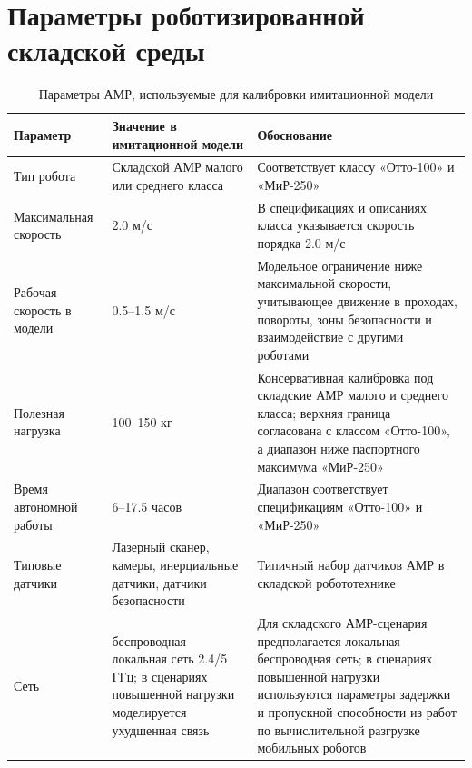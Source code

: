\chapter{Параметры роботизированной складской среды}\label{app:A}

\begin{table}[h]
	\centering
	\small
	\caption{Параметры АМР, используемые для калибровки имитационной модели}
	\label{tab:amr_real_params}
	\begin{tabular}{|p{}|p{}|p{}|}
		\hline
		\textbf{Параметр} &
		\textbf{Значение в имитационной модели} &
		\textbf{Обоснование} \\
		\hline
		Тип робота &
		Складской АМР малого или среднего класса &
		Соответствует классу «Отто-100» и «МиР-250»
		\cite{OTTO100Spec2026,MiR250Spec2026} \\
		\hline
		Максимальная скорость &
		2.0 м/с &
		В спецификациях и описаниях класса указывается
		скорость порядка 2.0 м/с \\
		\hline
		Рабочая скорость в модели &
		0.5--1.5 м/с &
		Модельное ограничение ниже максимальной скорости, учитывающее движение в
		проходах, повороты, зоны безопасности и взаимодействие с другими роботами \\
		\hline
		Полезная нагрузка &
		100--150 кг &
		Консервативная калибровка под складские АМР малого и среднего класса; верхняя граница согласована с классом «Отто-100», а диапазон ниже паспортного максимума «МиР-250» \\
		\hline
		Время автономной работы &
		6--17.5 часов &
		Диапазон соответствует спецификациям «Отто-100» и «МиР-250» \\
		\hline
		Типовые датчики &
		Лазерный сканер, камеры, инерциальные датчики, датчики безопасности &
		Типичный набор датчиков АМР в складской робототехнике
		\cite{Keith2024WarehouseAMRReview} \\
		\hline
		Сеть &
		беспроводная локальная сеть 2.4/5 ГГц; в сценариях повышенной нагрузки моделируется ухудшенная связь &
		Для складского АМР-сценария предполагается локальная беспроводная сеть; в
		сценариях повышенной нагрузки используются параметры задержки и пропускной способности из
		работ по вычислительной разгрузке мобильных роботов \cite{Baruffa2025AMRResourceAssignment} \\
		\hline
	\end{tabular}
\end{table}

